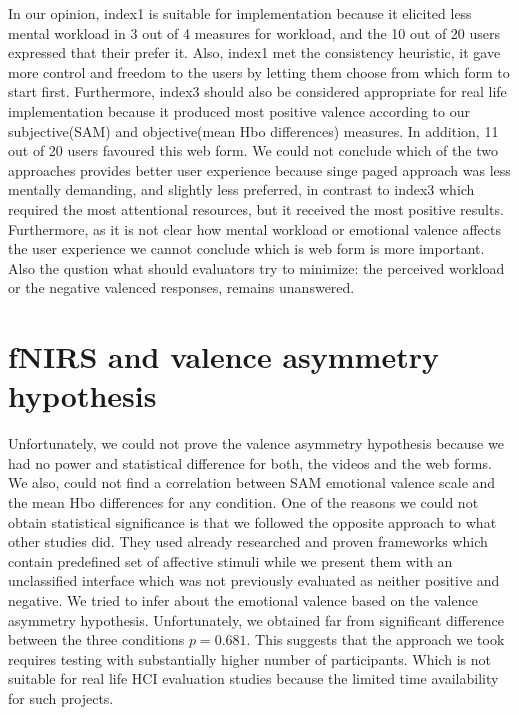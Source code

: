 \documentclass[a4paper]{report}
\begin{document}
			In our opinion, index1 is suitable for implementation because it elicited less mental workload in 3 out of 4 measures for workload, and the 10 out of 20 users expressed that their prefer it. Also, index1 met the consistency heuristic, it gave more control and freedom to the users by letting them choose from which form to start first. 	
			Furthermore, index3 should also be considered appropriate for real life implementation because it produced most positive valence according to our subjective(SAM) and objective(mean Hbo differences) measures. In addition, 11 out of 20 users favoured this web form. We could not conclude which of the two approaches provides better user experience because singe paged approach was less mentally demanding, and slightly less preferred, in contrast to index3 which required the most attentional resources, but it received the most positive results. Furthermore, as it is not clear how mental workload or emotional valence affects the user experience we cannot conclude which is web form is more important. Also the qustion what should evaluators try to minimize: the perceived workload or the negative valenced responses, remains unanswered.
				
	\section{fNIRS and valence asymmetry hypothesis}
		Unfortunately, we could not prove the valence asymmetry hypothesis\cite{davidson1992emotion} because we had no power and statistical difference for both, the videos and the web forms. We also, could not find a correlation between SAM emotional valence scale and the mean Hbo differences for any condition. One of the reasons we could not obtain statistical significance is that we followed the opposite approach to what other studies did. They used already researched and proven frameworks which contain predefined set of affective stimuli\cite{lang1997international} while we present them with an unclassified interface which was not previously evaluated as neither positive and negative. We tried to infer about the emotional valence based on the valence asymmetry hypothesis. Unfortunately, we obtained far from significant difference between the three conditions $p=0.681$. This suggests that the approach we took requires testing with substantially higher number of participants. Which is not suitable for real life HCI evaluation studies because the limited time availability for such projects.
	
\end{document}
